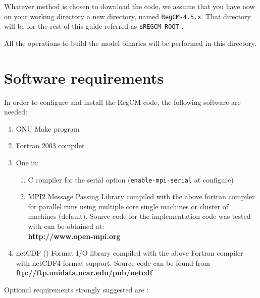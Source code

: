 %
%

Whatever method is chosen to download the code, we assume that you have now
on your working directory a new directory, named \verb=RegCM-4.5.x=.
That directory will be for the rest of this guide referred as 
\verb=$REGCM_ROOT= .

All the operations to build the model binaries will be performed in this
directory.

\section{Software requirements}

In order to configure and install the RegCM code, the following software are
needed:

\begin{enumerate}
\item GNU Make program
\item Fortran 2003 compiler
\item One in:
  \begin{enumerate}
    \item C compiler for the serial option (\verb=enable-mpi-serial= at
      configure)
    \item MPI2 Message Passing Library compiled with the above fortran compiler
     for parallel runs using multiple core single machines or cluster of
     machines (default).  Source code for the implementation code was tested
     with can be obtained at: \\
     {\bf http://www.open-mpi.org}
  \end{enumerate}
\item netCDF (\cite{Rew_90}) Format I/O library compiled with the above
  Fortran compiler with netCDF4 format support. Source code can be found from \\
  {\bf ftp://ftp.unidata.ucar.edu/pub/netcdf} \\
\end{enumerate}

Optional requirements strongly suggested are :

